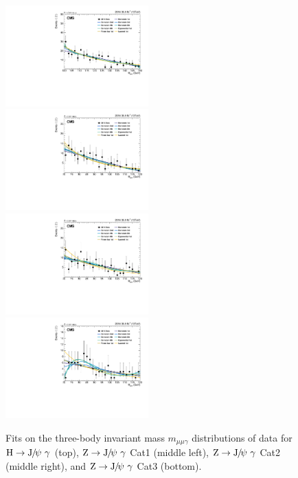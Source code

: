 		\begin{figure}[p]
		    \centering
		    \includegraphics[width=0.49\textwidth]{Fig/Multifit/MultiFit_HJpsiG_Inclusive}\\
		    \includegraphics[width=0.49\textwidth]{Fig/Multifit/MultiFit_ZJpsiG_EBHR9}~
		    \includegraphics[width=0.49\textwidth]{Fig/Multifit/MultiFit_ZJpsiG_EBLR9}\\
		    \includegraphics[width=0.49\textwidth]{Fig/Multifit/MultiFit_ZJpsiG_EE}~
		    \caption{Fits on the three-body invariant mass $m_{\mu\mu\gamma}$ distributions of data for $\PH\to\JPsi\ \gamma$ (top), $\cPZ\to\JPsi\ \gamma$ Cat1 (middle left), $\cPZ\to\JPsi\ \gamma$ Cat2 (middle right), and $\cPZ\to\JPsi\ \gamma$ Cat3 (bottom).\label{fig:Multifit}}
		\end{figure}
		
